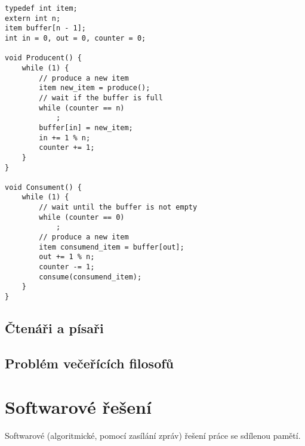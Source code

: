 \noindent\begin{minipage}{\linewidth}
\begin{lstlisting}[language=c_language, caption={Naivní implementace s aktivním čekáním.}]
typedef int item;
extern int n;
item buffer[n - 1];
int in = 0, out = 0, counter = 0;

void Producent() {
    while (1) {
        // produce a new item
        item new_item = produce();
        // wait if the buffer is full
        while (counter == n)
            ;
        buffer[in] = new_item;
        in += 1 % n;
        counter += 1;
    }
}

void Consument() {
    while (1) {
        // wait until the buffer is not empty
        while (counter == 0)
            ;
        // produce a new item
        item consumend_item = buffer[out];
        out += 1 % n;
        counter -= 1;
        consume(consumend_item);
    }
}
\end{lstlisting}
\end{minipage}

\subsection{Čtenáři a písaři}

\begin{compactitem}
    \item {}
\end{compactitem}

\subsection{Problém večeřících filosofů}

\begin{compactitem}
    \item {}
\end{compactitem}


\section{Softwarové řešení}

\begin{compactitem}
    \item Softwarové (algoritmické, pomocí zasílání zpráv) řešení práce se sdílenou pamětí.
\end{compactitem}

